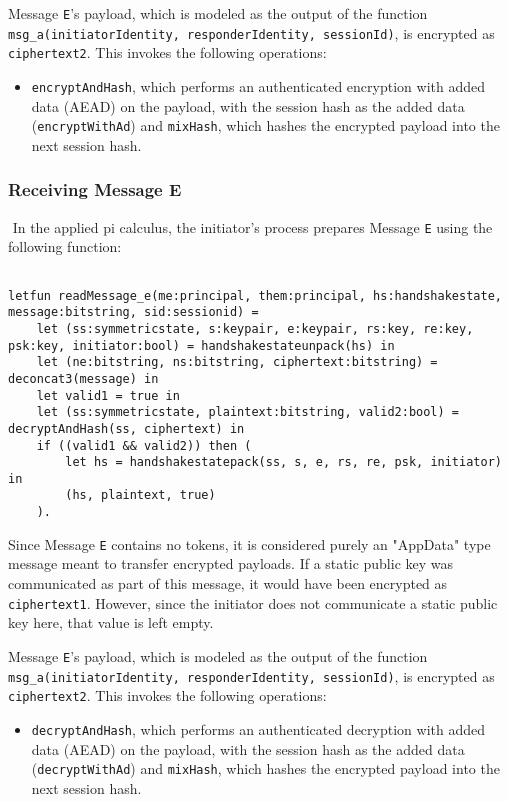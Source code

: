 Message \texttt{E}'s payload, which is modeled as the output of the function \texttt{msg\_a(initiatorIdentity, responderIdentity, sessionId)}, is encrypted as \texttt{ciphertext2}. This invokes the following operations:


\begin{itemize}

\item \texttt{encryptAndHash}, which performs an authenticated encryption with added data (AEAD) on the payload, with the session hash as the added data (\texttt{encryptWithAd}) and \texttt{mixHash}, which hashes the encrypted payload into the next session hash.

\end{itemize}
\subsubsection{Receiving Message E}$ $
In the applied pi calculus, the initiator's process prepares Message \texttt{E} using the following function:


\begin{lstlisting}

letfun readMessage_e(me:principal, them:principal, hs:handshakestate, message:bitstring, sid:sessionid) =
	let (ss:symmetricstate, s:keypair, e:keypair, rs:key, re:key, psk:key, initiator:bool) = handshakestateunpack(hs) in
	let (ne:bitstring, ns:bitstring, ciphertext:bitstring) = deconcat3(message) in
	let valid1 = true in
	let (ss:symmetricstate, plaintext:bitstring, valid2:bool) = decryptAndHash(ss, ciphertext) in
	if ((valid1 && valid2)) then (
		let hs = handshakestatepack(ss, s, e, rs, re, psk, initiator) in
		(hs, plaintext, true)
	).

\end{lstlisting}

Since Message \texttt{E} contains no tokens, it is considered purely an "AppData" type message meant to transfer encrypted payloads.
If a static public key was communicated as part of this message, it would have been encrypted as \texttt{ciphertext1}. However, since the initiator does not communicate a static public key here, that value is left empty.


Message \texttt{E}'s payload, which is modeled as the output of the function \texttt{msg\_a(initiatorIdentity, responderIdentity, sessionId)}, is encrypted as \texttt{ciphertext2}. This invokes the following operations:


\begin{itemize}

\item \texttt{decryptAndHash}, which performs an authenticated decryption with added data (AEAD) on the payload, with the session hash as the added data (\texttt{decryptWithAd}) and \texttt{mixHash}, which hashes the encrypted payload into the next session hash.

\end{itemize}
